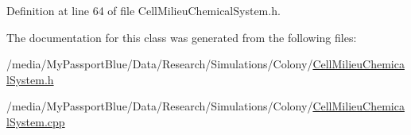 \-Definition at line 64 of file \-Cell\-Milieu\-Chemical\-System.\-h.



\-The documentation for this class was generated from the following files\-:\begin{DoxyCompactItemize}
\item 
/media/\-My\-Passport\-Blue/\-Data/\-Research/\-Simulations/\-Colony/\hyperlink{_cell_milieu_chemical_system_8h}{\-Cell\-Milieu\-Chemical\-System.\-h}\item 
/media/\-My\-Passport\-Blue/\-Data/\-Research/\-Simulations/\-Colony/\hyperlink{_cell_milieu_chemical_system_8cpp}{\-Cell\-Milieu\-Chemical\-System.\-cpp}\end{DoxyCompactItemize}
